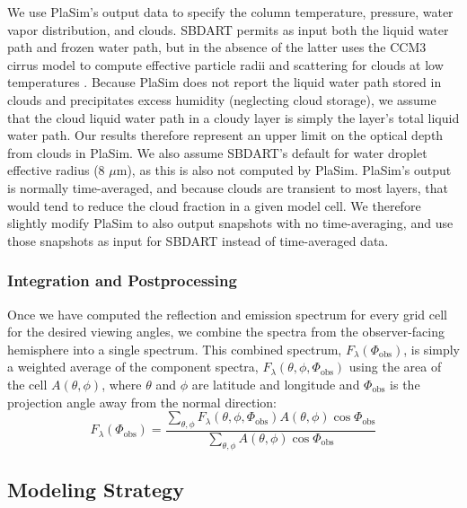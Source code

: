 \documentclass[fleqn,usenatbib]{mnras}
\begin{document}
We use PlaSim's output data to specify the column temperature, pressure, water vapor distribution, and clouds. SBDART permits as input both the liquid water path and frozen water path, but in the absence of the latter uses the CCM3 cirrus model to compute effective particle radii and scattering for clouds at low temperatures \citep{Ricchiazzi1998,ccm3-cirrus}. Because PlaSim does not report the liquid water path stored in clouds and precipitates excess humidity (neglecting cloud storage), we assume that the cloud liquid water path in a cloudy layer is simply the layer's total liquid water path. Our results therefore represent an upper limit on the optical depth from clouds in PlaSim. We also assume SBDART's default for water droplet effective radius (8 $\mu$m), as this is also not computed by PlaSim. PlaSim's output is normally time-averaged, and because clouds are transient to most layers, that would tend to reduce the cloud fraction in a given model cell. We therefore slightly modify PlaSim to also output snapshots with no time-averaging, and use those snapshots as input for SBDART instead of time-averaged data. 

\subsubsection{Integration and Postprocessing}

Once we have computed the reflection and emission spectrum for every grid cell for the desired viewing angles, we combine the spectra from the observer-facing hemisphere into a single spectrum. This combined spectrum, $F_\lambda(\Phi_{\text{obs}})$, is simply a weighted average of the component spectra, $F_\lambda(\theta,\phi,\Phi_{\text{obs}})$ using the area of the cell $A(\theta,\phi)$, where $\theta$ and $\phi$ are latitude and longitude and $\Phi_{\text{obs}}$ is the projection angle away from the normal direction:
\begin{equation}
F_\lambda(\Phi_{\text{obs}}) = \frac{\sum\limits_{\theta,\phi} F_\lambda(\theta,\phi,\Phi_{\text{obs}})A(\theta,\phi)\cos\Phi_{\text{obs}}}{\sum\limits_{\theta,\phi}A(\theta,\phi)\cos\Phi_{\text{obs}}}
\end{equation}


\subsection{Modeling Strategy}
\end{document}
